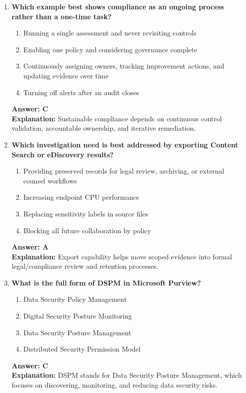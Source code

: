 \documentclass[10pt]{article}
\begin{document}
\begin{enumerate}[leftmargin=*]
\item \textbf{Which example best shows compliance as an ongoing process rather than a one-time task?}
\begin{enumerate}[label=\Alph*.]
  \item Running a single assessment and never revisiting controls
  \item Enabling one policy and considering governance complete
  \item Continuously assigning owners, tracking improvement actions, and updating evidence over time
  \item Turning off alerts after an audit closes
\end{enumerate}
\textbf{Answer: C}\\
\textbf{Explanation:} Sustainable compliance depends on continuous control validation, accountable ownership, and iterative remediation.

\item \textbf{Which investigation need is best addressed by exporting Content Search or eDiscovery results?}
\begin{enumerate}[label=\Alph*.]
  \item Providing preserved records for legal review, archiving, or external counsel workflows
  \item Increasing endpoint CPU performance
  \item Replacing sensitivity labels in source files
  \item Blocking all future collaboration by policy
\end{enumerate}
\textbf{Answer: A}\\
\textbf{Explanation:} Export capability helps move scoped evidence into formal legal/compliance review and retention processes.


\item \textbf{What is the full form of DSPM in Microsoft Purview?}
\begin{enumerate}[label=\Alph*.]
  \item Data Security Policy Management
  \item Digital Security Posture Monitoring
  \item Data Security Posture Management
  \item Distributed Security Permission Model
\end{enumerate}
\textbf{Answer: C}\\
\textbf{Explanation:} DSPM stands for Data Security Posture Management, which focuses on discovering, monitoring, and reducing data security risks.

\end{enumerate}
\end{document}
